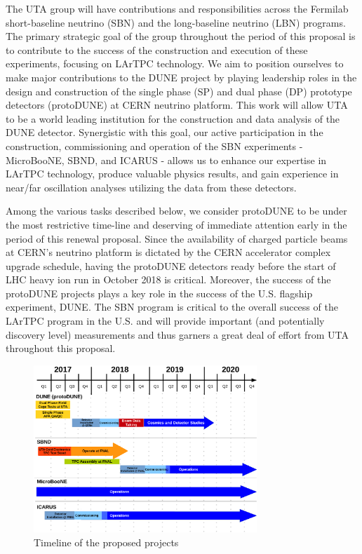The UTA group will have contributions and responsibilities across the Fermilab short-baseline neutrino (SBN) and the long-baseline neutrino (LBN) programs. The primary strategic goal of the group throughout the period of this proposal is to contribute to the success of the construction and execution of these experiments, focusing on LArTPC technology. We aim to position ourselves to make major contributions to the DUNE project by playing leadership roles in the design and construction of the single phase (SP) and dual phase (DP) prototype detectors (protoDUNE) at CERN neutrino platform. This work will allow UTA to be a world leading institution for the construction and data analysis of the DUNE detector. Synergistic with this goal, our active participation in the construction, commissioning and operation of the SBN experiments - MicroBooNE, SBND, and ICARUS - allows us to enhance our expertise in LArTPC technology, produce valuable physics results, and gain experience in near/far oscillation analyses utilizing the data from these detectors.

Among the various tasks described below, we consider protoDUNE to be under the most restrictive time-line and deserving of immediate attention early in the period of this renewal proposal. Since the availability of charged particle beams at CERN's neutrino platform is dictated by the CERN accelerator complex upgrade schedule, having the protoDUNE detectors ready before the start of LHC heavy ion run in October 2018 is critical. Moreover, the success of the protoDUNE projects plays a key role in the success of the U.S. flagship experiment, DUNE. The SBN program is critical to the overall success of the LArTPC program in the U.S. and will provide important (and potentially discovery level) measurements and thus garners a great deal of effort from UTA throughout this proposal.

\begin{figure}[htb]
\centering
\includegraphics[width=0.75\textwidth]{images/Timeline.pdf}
\caption[]{Timeline of the proposed projects}
\label{fig:IFTimeline}
\end{figure}

